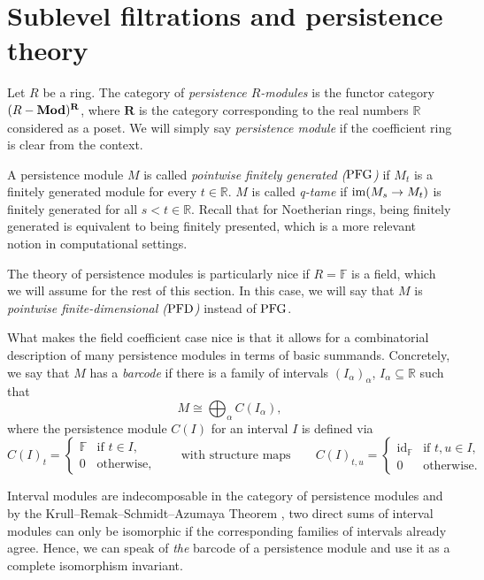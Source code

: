 
\section{Sublevel filtrations and persistence theory} \label{s:persistence}

Let $R$ be a ring. The category of \emph{persistence $R$-modules} is the functor category  $(R-\mathbf{Mod})^{\mathbf{R}}$, where $\mathbf{R}$ is the category corresponding to the real numbers $\mathbb{R}$ considered as a poset. We will simply say \emph{persistence module} if the coefficient ring is clear from the context. 

A persistence module $M$ is called \emph{pointwise finitely generated ($\mathrm{PFG}$)} if $M_{t}$ is a finitely generated module for every $t\in\mathbb{R}$. $M$ is called \emph{q-tame} if $\operatorname{im} (M_{s}\to M_{t})$ is finitely generated for all $s<t\in\mathbb{R}$. Recall that for Noetherian rings, being finitely generated is equivalent to being finitely presented, which is a more relevant notion in computational settings.

The theory of persistence modules is particularly nice if $R=\mathbb{F}$ is a field, which we will assume for the rest of this section. In this case, we will say that $M$ is \emph{pointwise finite-dimensional ($\mathrm{PFD}$)} instead of $\mathrm{PFG}$.

What makes the field coefficient case nice is that it allows for a combinatorial description of many persistence modules in terms of basic summands. Concretely, we say that $M$ has a \emph{barcode} if there is a family of intervals $(I_{\alpha})_{\alpha}$, $I_{\alpha}\subseteq\mathbb{R}$ such that
\[
M\cong\bigoplus_{\alpha} C(I_{\alpha}),
\]
where the persistence module $C(I)$ for an interval $I$ is defined via
\[
C(I)_t=
\begin{cases}
    \mathbb{F} & \text{if } t\in I,\\
    0              & \text{otherwise,}
\end{cases}
\qquad
\text{with structure maps}
\qquad
C(I)_{t,u}=
\begin{cases}
    \operatorname{id}_{\mathbb{F}} & \text{if } t,u\in I,\\
    0              & \text{otherwise.}
\end{cases}
\]

Interval modules are indecomposable in the category of persistence modules and by the Krull--Remak--Schmidt--Azumaya Theorem \cite{MR37832}, two direct sums of interval modules can only be isomorphic if the corresponding families of intervals already agree. Hence, we can speak of \emph{the} barcode of a persistence module and use it as a complete isomorphism invariant.

